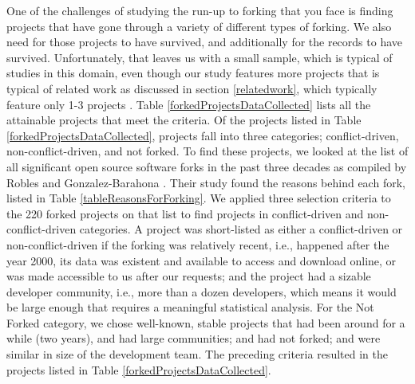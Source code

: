 \documentclass[12pt,letterpaper]{gthesis2}  %
\begin{document}
One of the challenges of studying the run-up to forking that you face is finding projects that have gone through a variety of different types of forking. We also need for those projects to have survived, and additionally for the records to have survived. Unfortunately, that leaves us with a small sample, which is typical of studies in this domain, even though our study features more projects that is typical of related work as discussed in section \ref{relatedwork}, which typically feature only 1-3 projects \cite{Baishakhi}\cite{JoseWebKit}\cite{Hannemann}. Table \ref{forkedProjectsDataCollected} lists all the attainable projects that meet the criteria. Of the projects listed in Table \ref{forkedProjectsDataCollected}, projects fall into three categories; conflict-driven, non-conflict-driven, and not forked. To find these projects, we looked at the list of all significant open source software forks in the past three decades as compiled by Robles and Gonzalez-Barahona \cite{Robles}. Their study found the reasons behind each fork, listed in Table \ref{tableReasonsForForking}. We applied three selection criteria to the 220 forked projects on that list to find projects in conflict-driven and non-conflict-driven categories. A project was short-listed as either a conflict-driven or non-conflict-driven if the forking was relatively recent, i.e., happened after the year 2000, its data was existent and available to access and download online, or was made accessible to us after our requests; and the project had a sizable developer community, i.e., more than a dozen developers, which means it would be large enough that requires a meaningful statistical analysis. For the Not Forked category, we chose well-known, stable projects that had been around for a while (two years), and had large communities; and had not forked; and were similar in size of the development team. The preceding criteria resulted in the projects listed in Table \ref{forkedProjectsDataCollected}.
\end{document}
